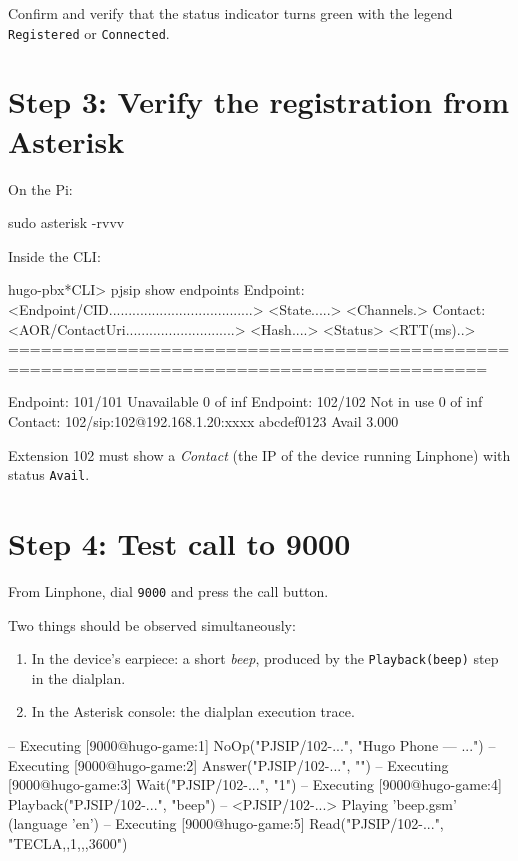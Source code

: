 Confirm and verify that the status indicator turns green with the legend \texttt{Registered} or \texttt{Connected}.

\section{Step 3: Verify the registration from Asterisk}

On the Pi:

\begin{shellcode}
sudo asterisk -rvvv
\end{shellcode}

Inside the CLI:

\begin{plaincode}
hugo-pbx*CLI> pjsip show endpoints
 Endpoint:  <Endpoint/CID.....................................>  <State.....>  <Channels.>
 Contact:   <AOR/ContactUri............................>  <Hash....> <Status> <RTT(ms)..>
==========================================================================================

 Endpoint:  101/101                                              Unavailable   0 of inf
 Endpoint:  102/102                                              Not in use    0 of inf
        Contact:  102/sip:102@192.168.1.20:xxxx                  abcdef0123   Avail        3.000
\end{plaincode}

Extension 102 must show a \emph{Contact} (the IP of the device running Linphone) with status \texttt{Avail}.

\section{Step 4: Test call to 9000}

From Linphone, dial \texttt{9000} and press the call button.

Two things should be observed simultaneously:

\begin{enumerate}
  \item In the device's earpiece: a short \emph{beep}, produced by the \texttt{Playback(beep)} step in the dialplan.
  \item In the Asterisk console: the dialplan execution trace.
\end{enumerate}

\begin{plaincode}
-- Executing [9000@hugo-game:1] NoOp("PJSIP/102-...", "Hugo Phone — ...")
-- Executing [9000@hugo-game:2] Answer("PJSIP/102-...", "")
-- Executing [9000@hugo-game:3] Wait("PJSIP/102-...", "1")
-- Executing [9000@hugo-game:4] Playback("PJSIP/102-...", "beep")
-- <PJSIP/102-...> Playing 'beep.gsm' (language 'en')
-- Executing [9000@hugo-game:5] Read("PJSIP/102-...", "TECLA,,1,,,3600")
\end{plaincode}

